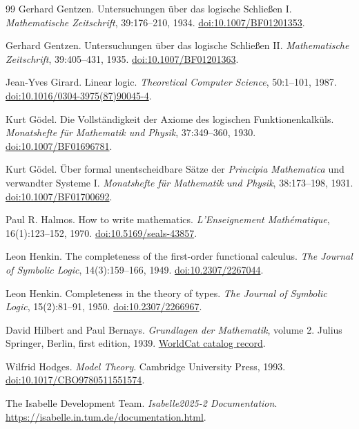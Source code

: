 \begin{thebibliography}{99}
Gerhard Gentzen.
Untersuchungen \"uber das logische Schlie\ss en I.
\emph{Mathematische Zeitschrift}, 39:176--210, 1934.
\href{https://doi.org/10.1007/BF01201353}{doi:10.1007/BF01201353}.

Gerhard Gentzen.
Untersuchungen \"uber das logische Schlie\ss en II.
\emph{Mathematische Zeitschrift}, 39:405--431, 1935.
\href{https://doi.org/10.1007/BF01201363}{doi:10.1007/BF01201363}.

Jean-Yves Girard.
Linear logic.
\emph{Theoretical Computer Science}, 50:1--101, 1987.
\href{https://doi.org/10.1016/0304-3975(87)90045-4}{doi:10.1016/0304-3975(87)90045-4}.

Kurt G\"odel.
Die Vollst\"andigkeit der Axiome des logischen Funktionenkalk\"uls.
\emph{Monatshefte f\"ur Mathematik und Physik}, 37:349--360, 1930.
\href{https://doi.org/10.1007/BF01696781}{doi:10.1007/BF01696781}.

Kurt G\"odel.
\"Uber formal unentscheidbare S\"atze der \emph{Principia Mathematica} und
verwandter Systeme I.
\emph{Monatshefte f\"ur Mathematik und Physik}, 38:173--198, 1931.
\href{https://doi.org/10.1007/BF01700692}{doi:10.1007/BF01700692}.

Paul R. Halmos.
How to write mathematics.
\emph{L'Enseignement Math\'ematique}, 16(1):123--152, 1970.
\href{https://doi.org/10.5169/seals-43857}{doi:10.5169/seals-43857}.

Leon Henkin.
The completeness of the first-order functional calculus.
\emph{The Journal of Symbolic Logic}, 14(3):159--166, 1949.
\href{https://doi.org/10.2307/2267044}{doi:10.2307/2267044}.

Leon Henkin.
Completeness in the theory of types.
\emph{The Journal of Symbolic Logic}, 15(2):81--91, 1950.
\href{https://doi.org/10.2307/2266967}{doi:10.2307/2266967}.

David Hilbert and Paul Bernays.
\emph{Grundlagen der Mathematik}, volume 2.
Julius Springer, Berlin, first edition, 1939.
\href{https://search.worldcat.org/title/Grundlagen-der-Mathematik.-Bd.-2/oclc/1424451730}{WorldCat catalog record}.

Wilfrid Hodges.
\emph{Model Theory}.
Cambridge University Press, 1993.
\href{https://doi.org/10.1017/CBO9780511551574}{doi:10.1017/CBO9780511551574}.

The Isabelle Development Team.
\emph{Isabelle2025-2 Documentation}.
\url{https://isabelle.in.tum.de/documentation.html}.


\end{thebibliography}
